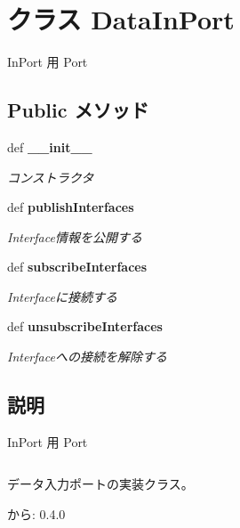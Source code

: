 \section{クラス DataInPort}
\label{classsource__py_1_1_data_in_port_1_1_data_in_port}
InPort 用 Port  


\subsection*{Public メソッド}
\begin{CompactItemize}
\item 
def {\bf \_\-\_\-init\_\-\_\-}
\begin{CompactList}\small\item\em コンストラクタ \item\end{CompactList}\item 
def {\bf publishInterfaces}
\begin{CompactList}\small\item\em Interface情報を公開する \item\end{CompactList}\item 
def {\bf subscribeInterfaces}
\begin{CompactList}\small\item\em Interfaceに接続する \item\end{CompactList}\item 
def {\bf unsubscribeInterfaces}
\begin{CompactList}\small\item\em Interfaceへの接続を解除する \item\end{CompactList}\end{CompactItemize}


\subsection{説明}
InPort 用 Port 



\footnotesize\begin{verbatim}
\end{verbatim}
\normalsize


データ入力ポートの実装クラス。

\begin{Desc}
\item[から:]0.4.0 \end{Desc}



